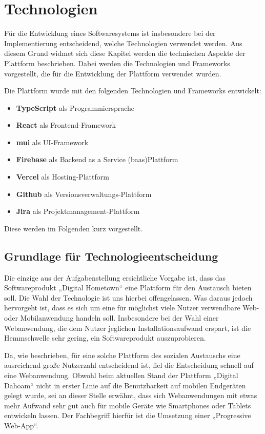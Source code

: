 \chapter{Technologien}
\label{ch:technical}

Für die Entwicklung eines Softwaresystems ist insbesondere bei der Implementierung entscheidend, welche Technologien verwendet werden.
Aus diesem Grund widmet sich diese Kapitel werden die technischen Aspekte der Plattform beschrieben.
Dabei werden die Technologien und Frameworks vorgestellt, die für die Entwicklung der Plattform verwendet wurden.

Die Plattform wurde mit den folgenden Technologien und Frameworks entwickelt:
\begin{itemize}
  \item \textbf{TypeScript} als Programmiersprache
  \item \textbf{React} als Frontend-Framework
  \item \textbf{\gls{mui}} als UI-Framework
  \item \textbf{Firebase} als Backend as a Service (\gls{baas})Plattform
  \item \textbf{Vercel} als Hosting-Plattform
  \item \textbf{Github} als Versionsverwaltungs-Plattform
  \item \textbf{Jira} als Projektmanagement-Plattform
\end{itemize}

Diese werden im Folgenden kurz vorgestellt.

\section{Grundlage für Technologieentscheidung}
\label{sec:technicalDecision}

Die einzige aus der Aufgabenstellung ersichtliche Vorgabe ist, dass das Softwareprodukt „Digital Hometown“ eine Plattform für den Austausch bieten soll.
Die Wahl der Technologie ist uns hierbei offengelassen.
Was daraus jedoch hervorgeht ist, dass es sich um eine für möglichst viele Nutzer verwendbare Web- oder Mobilanwendung handeln soll.
Insbesondere bei der Wahl einer Webanwendung, die dem Nutzer jeglichen Installationsaufwand erspart, ist die Hemmschwelle sehr gering, ein Softwareprodukt auszuprobieren.

Da, wie beschrieben, für eine solche Plattform des sozialen Austauschs eine ausreichend große Nutzerzahl entscheidend ist, fiel die Entscheidung schnell auf eine Webanwendung.
Obwohl beim aktuellen Stand der Plattform „Digital Dahoam“ nicht in erster Linie auf die Benutzbarkeit auf mobilen Endgeräten gelegt wurde, sei an dieser Stelle erwähnt, dass sich Webanwendungen mit etwas mehr Aufwand sehr gut auch für mobile Geräte wie Smartphones oder Tablets entwickeln lassen.
Der Fachbegriff hierfür ist die Umsetzung einer „Progressive Web-App“.

